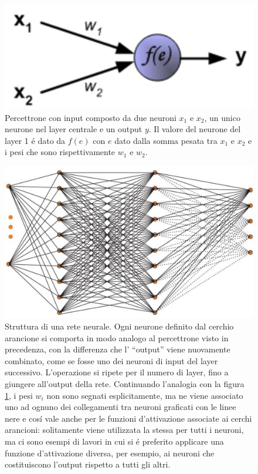 \documentclass[a4paper,12pt]{report}
\begin{document}
 \begin{figure}[h!]
  \centering
  \includegraphics[scale=0.3]{perceptron.png}
  \caption{Percettrone con input composto da due neuroni $x_1$ e $x_2$, un unico neurone nel layer centrale e un output $y$. Il valore del neurone del layer 1 \'e dato da $f(e)$ con $e$ dato dalla somma pesata tra $x_1$ e $x_2$ e i pesi che sono rispettivamente $w_1$ e $w_2$.}
  \label{perceptronpng}
 \end{figure}
 
 \begin{figure}[h!]
  \centering
  \includegraphics[scale=0.35]{NeuralNetwork.png}
  \caption{Struttura di una rete neurale. Ogni neurone definito dal cerchio arancione si comporta in modo analogo al percettrone visto in precedenza, con la differenza che l' ``output'' viene nuovamente combinato, come se fosse uno dei neuroni di input del layer successivo. L'operazione si ripete per il numero di layer, fino a giungere all'output della rete. Continuando l'analogia con la figura \ref{perceptronpng}, i pesi $w_i$ non sono segnati esplicitamente, ma ne viene associato uno ad ognuno dei collegamenti tra neuroni graficati con le linee nere e cos\'i vale anche per le funzioni d'attivazione associate ai cerchi arancioni: solitamente viene utilizzata la stessa per tutti i neuroni, ma ci sono esempi di lavori in cui si \'e preferito applicare una funzione d'attivazione diversa, per esempio, ai neuroni che costituiscono l'output rispetto a tutti gli altri.}
  \label{NeuralNetworkpng}
 \end{figure}
\end{document}
